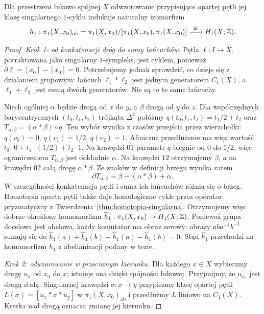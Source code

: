 \begin{twierdzenie}
\label{thm:hurewicz-h1}
Dla przestrzeni łukowo spójnej $X$ odwzorowanie przypisujące
opartej pętli jej klasę singularnego $1$-cyklu indukuje naturalny
izomorfizm
\[
 h_1:\pi_1(X,x_0)_{\mathrm{ab}}
 =\pi_1(X,x_0)/[\pi_1(X,x_0),\pi_1(X,x_0)]
 \xrightarrow{\ \cong\ }H_1(X;\mathbb{Z}).
\]
\end{twierdzenie}
\begin{proof}
\emph{Krok 1: od konkatenacji dróg do sumy łańcuchów.}
Pętla $\ell:I\to X$, potraktowana jako singularny $1$-sympleks,
jest cyklem, ponieważ $\partial\ell=[x_0]-[x_0]=0$.
Potrzebujemy jednak sprawdzić, co dzieje się z działaniem grupowym:
łańcuch $\ell_1*\ell_2$ jest jednym generatorem $C_1(X)$,
a $\ell_1+\ell_2$ jest sumą dwóch generatorów. Nie są to te same łańcuchy.

Niech ogólniej $\alpha$ będzie drogą od $x$ do $y$, a $\beta$
drogą od $y$ do $z$. Dla współrzędnych barycentrycznych
$(t_0,t_1,t_2)$ trójkąta $\Delta^2$ połóżmy
$q(t_0,t_1,t_2)=t_1/2+t_2$ oraz
$T_{\alpha,\beta}=(\alpha*\beta)\circ q$.
Ten wybór wynika z czasów przejścia przez wierzchołki:
$q(v_0)=0$, $q(v_1)=1/2$, $q(v_2)=1$.
Afiniczne przedłużenie ma więc wartość
$t_0\cdot0+t_1\cdot(1/2)+t_2\cdot1$.
Na krawędzi $01$ parametr $q$ biegnie od $0$ do $1/2$,
więc ograniczeniem $T_{\alpha,\beta}$ jest dokładnie $\alpha$.
Na krawędzi $12$ otrzymujemy $\beta$, a na krawędzi $02$
całą drogę $\alpha*\beta$. Ze znaków w definicji brzegu wynika zatem
\[
 \partial T_{\alpha,\beta}
 =\beta-(\alpha*\beta)+\alpha.
\]
W szczególności konkatenacja pętli i suma ich łańcuchów
różnią się o brzeg. Homotopia oparta pętli także daje homologiczne
cykle przez operator pryzmatyczny z
Twierdzenia~\ref{thm:homotopia-singularna}.
Otrzymujemy więc dobrze określony homomorfizm
$\widehat h_1:\pi_1(X,x_0)\to H_1(X;\mathbb{Z})$.
Ponieważ grupa docelowa jest abelowa, każdy komutator ma obraz zerowy:
obrazy $aba^{-1}b^{-1}$ sumują się do
$\widehat h_1(a)+\widehat h_1(b)-\widehat h_1(a)-\widehat h_1(b)=0$.
Stąd $\widehat h_1$ przechodzi na homomorfizm $h_1$
z abelianizacji podany w tezie.

\emph{Krok 2: odwzorowanie w przeciwnym kierunku.}
Dla każdego $x\in X$ wybierzmy drogę $u_x$ od $x_0$ do $x$;
istnieje ona dzięki spójności łukowej. Przyjmijmy, że $u_{x_0}$
jest drogą stałą. Singularnej krawędzi $\sigma:x\to y$ przypiszmy
klasę opartej pętli
$L(\sigma)=[u_x*\sigma*\bar u_y]$
w $\pi_1(X,x_0)_{\mathrm{ab}}$ i przedłużmy $L$ liniowo
na $C_1(X)$. Kreska nad drogą oznacza zmianę jej kierunku.


\end{proof}
